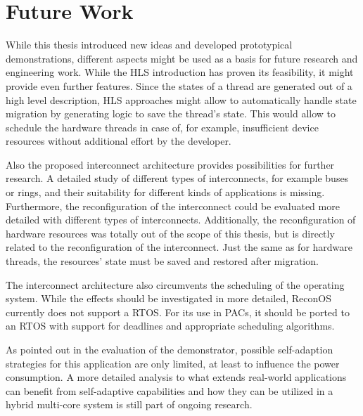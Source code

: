 \section{Future Work}
While this thesis introduced new ideas and developed prototypical
demonstrations, different aspects might be used as a basis for future research
and engineering work. While the \ac{HLS} introduction has proven its
feasibility, it might provide even further features. Since the states of a
thread are generated out of a high level description, \ac{HLS} approaches
might allow to automatically handle state migration by generating logic to
save the thread's state. This would allow to schedule the hardware threads in
case of, for example, insufficient device resources without additional effort
by the developer.

Also the proposed interconnect architecture provides possibilities for further
research. A detailed study of different types of interconnects, for example
buses or rings, and their suitability for different kinds of applications is
missing. Furthermore, the reconfiguration of the interconnect could be
evaluated more detailed with different types of interconnects. Additionally,
the reconfiguration of hardware resources was totally out of the scope of this
thesis, but is directly related to the reconfiguration of the interconnect.
Just the same as for hardware threads, the resources' state must be saved and
restored after migration.

The interconnect architecture also circumvents the scheduling of the operating
system. While the effects should be investigated in more detailed, ReconOS
currently does not support a \ac{RTOS}. For its use in \acp{PAC}, it should be
ported to an \ac{RTOS} with support for deadlines and appropriate scheduling
algorithms.

As pointed out in the evaluation of the demonstrator, possible self-adaption
strategies for this application are only limited, at least to influence the
power consumption. A more detailed analysis to what extends real-world
applications can benefit from self-adaptive capabilities and how they can be
utilized in a hybrid multi-core system is still part of ongoing research.